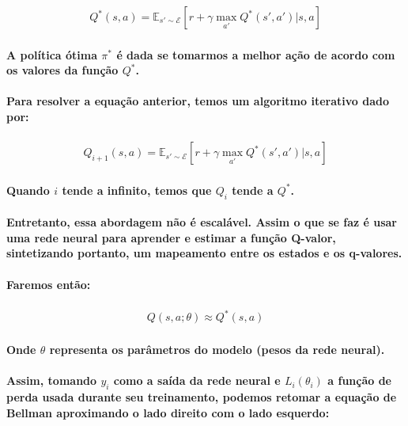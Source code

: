 \documentclass[a4paper]{article}    %
\begin{document}
\begin{align*}
    Q^*(s,a) = \mathbb{E}_{s'\sim \mathcal{E}}\left[r+\gamma\max_{a'}Q^*(s',a')|s,a\right]
\end{align*} 

\paragraph{A política ótima $\pi^*$ é dada se tomarmos a melhor ação de acordo com os valores da função $Q^*$.}

\paragraph{Para resolver a equação anterior, temos um algoritmo iterativo dado por:}

\begin{align*}
    Q_{i+1}(s,a) = \mathbb{E}_{s'\sim \mathcal{E}}\left[r+\gamma\max_{a'}Q^*(s',a')|s,a\right]
\end{align*} 

\paragraph{Quando $i$ tende a infinito, temos que $Q_i$ tende a $Q^*$.}
\paragraph{Entretanto, essa abordagem não é escalável. Assim o que se faz é usar uma rede neural para aprender e estimar a função Q-valor, sintetizando portanto, um mapeamento entre os estados e os q-valores.}

\paragraph{Faremos então:}
\begin{align*}
    Q(s,a;\theta) \approx Q^*(s,a)
\end{align*} 

\paragraph{Onde $\theta$ representa os parâmetros do modelo (pesos da rede neural).}

\paragraph{Assim, tomando $y_i$ como a saída da rede neural e $L_i(\theta_i)$ a função de perda usada durante seu treinamento, podemos retomar a equação de Bellman aproximando o lado direito com o lado esquerdo:}
\end{document}
